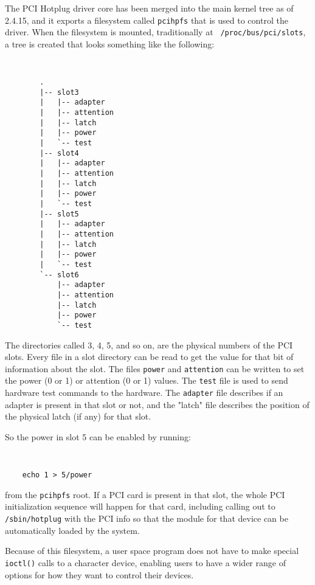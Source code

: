 \documentclass[twocolumn]{article}
\begin{document}
The PCI Hotplug driver core has been merged into the main kernel tree as of
2.4.15, and it exports a filesystem called {\tt pcihpfs} that is used to
control the driver.  When the filesystem is mounted, traditionally at {\tt
/proc/bus/pci/slots}, a tree is created that looks something like the
following:
{\tt \small
\begin{verbatim}
        .
        |-- slot3
        |   |-- adapter
        |   |-- attention
        |   |-- latch
        |   |-- power
        |   `-- test
        |-- slot4
        |   |-- adapter
        |   |-- attention
        |   |-- latch
        |   |-- power
        |   `-- test
        |-- slot5
        |   |-- adapter
        |   |-- attention
        |   |-- latch
        |   |-- power
        |   `-- test
        `-- slot6
            |-- adapter
            |-- attention
            |-- latch
            |-- power
            `-- test
\end{verbatim}
}


The directories called 3, 4, 5, and so on, are the physical numbers of the
PCI slots.  Every file in a slot directory can be read to get the value for
that bit of information about the slot.  The files {\tt power} and {\tt attention}
can be written to set the power (0 or 1) or attention (0 or 1) values.
The {\tt test} file is used to send hardware test commands to the hardware.
The {\tt adapter} file describes if an adapter is present in that slot or not,
and the "latch" file describes the position of the physical latch (if any)
for that slot.

So the power in slot 5 can be enabled by running:
{\tt \small
\begin{verbatim}
    echo 1 > 5/power
\end{verbatim}
}
from the {\tt pcihpfs} root.  If a PCI card is present in that slot, the whole
PCI initialization sequence will happen for that card, including calling
out to {\tt /sbin/hotplug} with the PCI info so that the module for that
device can be automatically loaded by the system.

Because of this filesystem, a user space program does not have to make
special {\tt ioctl()} calls to a character device, enabling users to have a
wider range of options for how they want to control their devices.
\end{document}
